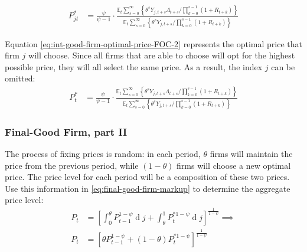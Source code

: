 \documentclass[
	12pt, 
	]{article}
\numberwithin{equation}{section}
\DeclareMathOperator{\dif}{d}
\newcommand{\E}[1][t]{{\mathbb{E}_{#1}}}
\theoremstyle{definition}
\theoremstyle{plain}
\theoremstyle{plain}
\theoremstyle{plain}
\begin{document}
\vspace*{-1cm}

\begin{align}
\label{eq:int-good-firm-optimal-price-FOC-2}
	P_{jt}^\ast &= 
	\frac{\psi}{\psi-1} \cdot
	\frac{
		\E \sum_{s=0}^{\infty} \left\{ 
		\theta^s Y_{j,t+s} \Lambda_{t+s} / \prod_{k=0}^{s-1}(1+R_{t+k}) \right\} } {\E \sum_{s=0}^{\infty} \left\{
	\theta^s Y_{j,t+s} / \prod_{k=0}^{s-1}(1+R_{t+k}) \right\}}
\end{align}


Equation \ref{eq:int-good-firm-optimal-price-FOC-2} represents the optimal price that firm $j$ will choose. Since all firms that are able to choose will opt for the highest possible price, they will all select the same price. As a result, the index $j$ can be omitted:
\begin{align}
\label{eq:int-good-firm-optimal-price-FOC-3}
	P_t^\ast &= 
\frac{\psi}{\psi-1} \cdot
\frac{
	\E \sum_{s=0}^{\infty} \left\{ 
	\theta^s Y_{j,t+s} \Lambda_{t+s} / \prod_{k=0}^{s-1}(1+R_{t+k}) \right\} } {\E \sum_{s=0}^{\infty} \left\{
	\theta^s Y_{j,t+s} / \prod_{k=0}^{s-1}(1+R_{t+k}) \right\}}
\end{align}


\subsubsection{Final-Good Firm, part II}

The process of fixing prices is random: in each period, $\theta$ firms will maintain the price from the previous period, while $(1-\theta)$ firms will choose a new optimal price. The price level for each period will be a composition of these two prices. Use this information in \ref{eq:final-good-firm-markup} to determine the aggregate price level:
\begin{align}
	P_t & = \left[ \int_{0}^{\theta} P_{t-1}^{1-\psi} \dif j + \int_{\theta}^{1} P_t^{\ast 1-\psi} \dif j \right]^{\frac{1}{1-\psi}}  \implies \nonumber \\
	P_t & = \left[ \theta P_{t-1}^{1-\psi} + (1-\theta) P_t^{\ast 1-\psi} \right]^\frac{1}{1-\psi} \label{eq:general-price-level}
\end{align}
\end{document}
